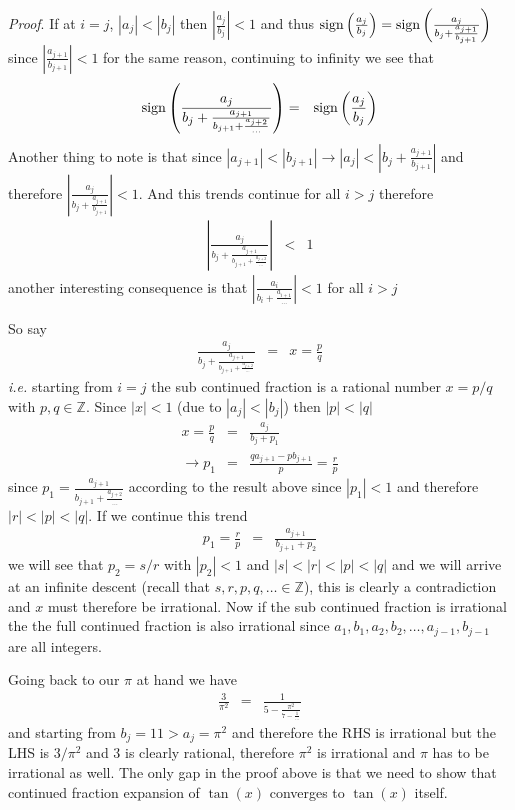 \documentclass[aps,preprint,preprintnumbers,nofootinbib,showpacs,prd]{revtex4-1}
\newcommand{\ie}{{\it i.e.} }
\newcommand{\nbea}{\begin{eqnarray*}}
\newcommand{\neea}{\end{eqnarray*}}
\newcommand{\sign}{{\rm sign}}
\begin{document}
{\it Proof}. If at $i = j$, $|a_j| < |b_j|$ then $\left | \frac{a_j}{b_j} \right | < 1$ and thus $\sign\left ( \frac{a_{j}}{b_{j}} \right ) = \sign \left ( \frac{a_{j}}{b_{j} + \frac{a_{j+1}}{b_{j+1}}}\right )$ since $\left | \frac{a_{j+1}}{b_{j+1}} \right | < 1$ for the same reason, continuing to infinity we see that
%
\nbea
\sign\left ( \frac{a_{j}}{b_{j} + \frac{a_{j+1}}{b_{j+1} + \frac{a_{j+2}}{\ldots}}}\right ) & = & \sign\left ( \frac{a_{j}}{b_{j}} \right )
\neea
%
Another thing to note is that since $|a_{j+1}| < |b_{j+1}| \to |a_j| < \left | b_j + \frac{a_{j+1}}{b_{j+1}} \right |$ and therefore $\left | \frac{a_j}{b_j + \frac{a_{j+1}}{b_{j+1}}}\right | < 1$. And this trends continue for all $i > j$ therefore
%
\nbea
\left | \frac{a_{j}}{b_{j} + \frac{a_{j+1}}{b_{j+1} + \frac{a_{j+2}}{\ldots}}}\right | & < & 1
\neea
%
another interesting consequence is that $\left | \frac{a_i}{b_i + \frac{a_{i+1}}{\ldots}} \right | < 1$ for all $i > j$

So say
%
\nbea
\frac{a_{j}}{b_{j} + \frac{a_{j+1}}{b_{j+1} + \frac{a_{j+2}}{\ldots}}} & = & x = \frac{p}{q}
\neea
%
\ie starting from $i = j$ the sub continued fraction is a rational number $x = p/q$ with $p,q \in \mathbb{Z}$. Since $|x| < 1$ (due to $|a_j| < |b_j|$) then $|p| < |q|$
%
\nbea
x = \frac{p}{q} & = & \frac{a_{j}}{b_{j} + p_1} \\
\to p_1 & = & \frac{qa_{j+1} - pb_{j+1}}{p} = \frac{r}{p}
\neea
%
since $p_1 = \frac{a_{j+1}}{b_{j+1} + \frac{a_{j+2}}{\ldots}}$ according to the result above since $|p_1| < 1$ and therefore $|r| < |p| < |q|$. If we continue this trend
%
\nbea
p_1 = \frac{r}{p} & = & \frac{a_{j+1}}{b_{j+1} + p_2}
\neea
%
we will see that $p_2 = s/r$ with $|p_2| < 1$ and $|s| < |r| < |p| < |q|$ and we will arrive at an infinite descent (recall that $s,r,p,q,\ldots \in \mathbb{Z}$), this is clearly a contradiction and $x$ must therefore be irrational. Now if the sub continued fraction is irrational the the full continued fraction is also irrational since $a_1, b_1, a_2, b_2, \ldots, a_{j-1}, b_{j-1}$ are all integers.

Going back to our $\pi$ at hand we have
%
\nbea
\frac{3}{\pi^2} & = & \frac{1}{5 - \frac{\pi^2}{7 - \frac{1}{\ldots}}}
\neea
%
and starting from $b_j = 11 > a_j = \pi^2$ and therefore the RHS is irrational but the LHS is $3/\pi^2$ and $3$ is clearly rational, therefore $\pi^2$ is irrational and $\pi$ has to be irrational as well. The only gap in the proof above is that we need to show that continued fraction expansion of $\tan(x)$ converges to $\tan(x)$ itself.
\end{document}
